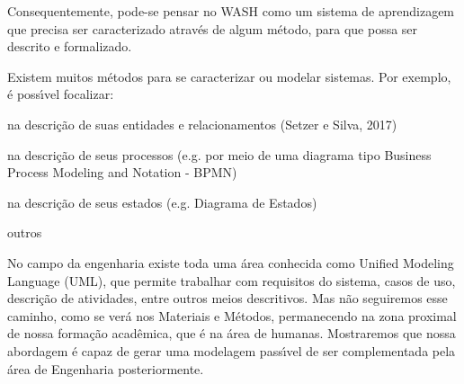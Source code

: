 \documentclass[
12pt,		%
openright,	%
twoside,  %
a4paper,			%
chapter=TITLE,		%
english,			%
french,				%
spanish,			%
brazil				%
]{USPSC-classe/USPSC}
\begin{document}
\noindent\begin{center}\mbox{\centering{}}\end{center}


Consequentemente, pode-se pensar no WASH como um sistema de aprendizagem que precisa ser caracterizado atrav\'es de algum m\'etodo, para que possa ser descrito e formalizado.














Existem muitos m\'etodos para se caracterizar ou modelar sistemas. Por exemplo, \'e poss\'{\i}vel focalizar:















\begin{alineas}
\item na descri\c{c}\~ao de suas entidades e relacionamentos  (Setzer e Silva, 2017)
\item na descri\c{c}\~ao de seus processos (e.g. por meio de uma diagrama tipo Business Process Modeling and Notation - BPMN)
\item na descri\c{c}\~ao de seus estados (e.g. Diagrama de Estados)
\item outros
\end{alineas}

No campo da engenharia existe toda uma \'area conhecida como Unified Modeling Language (UML), que permite trabalhar com requisitos do sistema, casos de uso, descri\c{c}\~ao de atividades, entre outros meios descritivos. Mas n\~ao seguiremos esse caminho, como se ver\'a nos Materiais e M\'etodos, permanecendo na zona proximal de nossa forma\c{c}\~ao acad\^emica, que \'e na \'area de humanas. Mostraremos que nossa abordagem \'e capaz de gerar uma modelagem pass\'{\i}vel de ser complementada pela \'area de Engenharia posteriormente.
\end{document}

